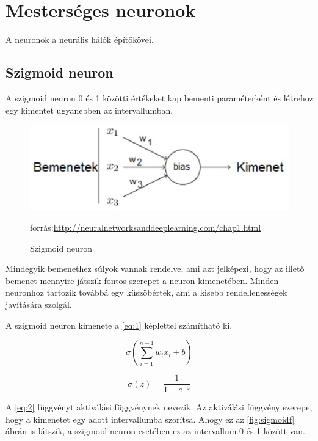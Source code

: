\section{Mesterséges neuronok}\label{sec:INTRO:neurons}
A neuronok a neurális hálók építőkövei. 
\subsection{Szigmoid neuron}

A szigmoid neuron 0 és 1 közötti értékeket kap bementi paraméterként és létrehoz egy kimentet ugyanebben az intervallumban.

\begin{figure}[h]
\centering

\includegraphics[scale=1]{images/neuron.eps}
\caption{Szigmoid neuron}
\small forrás:\url{http://neuralnetworksanddeeplearning.com/chap1.html}


\label{fig:neuron}
\end{figure}

Mindegyik bemenethez súlyok vannak rendelve, ami azt jelképezi, hogy az illető bemenet mennyire játszik fontos szerepet a neuron kimenetében. Minden neuronhoz tartozik továbbá egy küszöbérték, ami a kisebb rendellenességek javítására szolgál.

A szigmoid neuron kimenete a \ref{eq:1} képlettel számítható ki.

\begin{equation} \label{eq:1}
\sigma(\sum\limits_{i=1}^{n-1} w_{i}x_{i} + b)
\end{equation}

\begin{equation} \label{eq:2}
\sigma(z) = \frac{1}{1+e^{-z}}
\end{equation}

A \ref{eq:2} függvényt aktiválási függvénynek nevezik. Az aktiválási függvény szerepe, hogy a kimenetet egy adott intervallumba szorítsa. Ahogy ez az \ref{fig:sigmoidf} ábrán is látszik, a szigmoid neuron esetében ez az intervallum 0 és 1 között van. 

